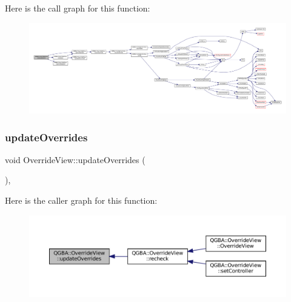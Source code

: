 Here is the call graph for this function\+:
\nopagebreak
\begin{figure}[H]
\begin{center}
\leavevmode
\includegraphics[width=350pt]{class_q_g_b_a_1_1_override_view_a2f0259e94cf4e7bcbc51f84e84c24574_cgraph}
\end{center}
\end{figure}
\mbox{\label{class_q_g_b_a_1_1_override_view_a70619d8bcae2e4941a0d0c35d4c5bb59}} 
\subsubsection{\texorpdfstring{update\+Overrides}{updateOverrides}}
{\footnotesize\ttfamily void Override\+View\+::update\+Overrides (\begin{DoxyParamCaption}{ }\end{DoxyParamCaption})\hspace{0.3cm}{\ttfamily [private]}, {\ttfamily [slot]}}

Here is the caller graph for this function\+:
\nopagebreak
\begin{figure}[H]
\begin{center}
\leavevmode
\includegraphics[width=350pt]{class_q_g_b_a_1_1_override_view_a70619d8bcae2e4941a0d0c35d4c5bb59_icgraph}
\end{center}
\end{figure}


